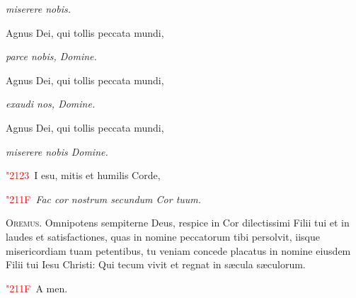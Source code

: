 \documentclass[12pt]{article}\errorcontextlines=9
\newcommand\versic[1]{%
\textcolor{red}{\char"2123\ }#1%
}
\newcommand\response[1]{%
\textcolor{red}{\char"211F\ }#1%
}
\begin{document}
\begin{multicols}{2}
\hfill\textit{miserere nobis.}

Agnus Dei, qui tollis peccata mundi,

\hfill\textit{parce nobis, Domine.}

Agnus Dei, qui tollis peccata mundi,

\hfill\textit{exaudi nos, Domine.}

Agnus Dei, qui tollis peccata mundi,

\hfill\textit{miserere nobis Domine.}

\bigskip

\versic Iesu, mitis et humilis Corde,

\response \textit{Fac cor nostrum secundum Cor tuum.}

\bigskip

\lettrine{O}{\color{red}remus}. Omnipotens sempiterne Deus, respice in Cor dilectissimi Filii tui et in laudes et satisfactiones, quas in nomine peccatorum tibi persolvit, iisque misericordiam tuam petentibus, tu veniam concede placatus in nomine eiusdem Filii tui Iesu Christi: Qui tecum vivit et regnat in s\ae cula s\ae culorum.

\response Amen.

\end{multicols}

\restoregeometry
\end{document}
